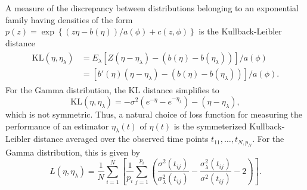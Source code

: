 A measure of the discrepancy between distributions belonging to an exponential family having densities of the form $p\left(z\right) = \exp\left\{\left(z \eta - b\left(\eta\right)\right)/a\left(\phi\right) + c\left(z,\phi\right) \right\}$ is the Kullback-Leibler distance
\begin{align}
\begin{split} \label{eq:kl-distance-definition}
\mbox{KL}\left(\eta, \eta_\lambda\right) &= E_\lambda\left[Z \left(\eta - \eta_\lambda \right) - \left(b\left(\eta\right)- b\left(\eta_\lambda\right) \right)\right]/a\left(\phi\right)\\
&=\left[ b'\left(\eta\right) \left(\eta - \eta_\lambda \right) - \left(b\left(\eta\right)- b\left(\eta_\lambda\right) \right)\right]/a\left(\phi\right).
\end{split}
\end{align}
\noindent
For the Gamma distribution, the KL distance simplifies to
\[
\mbox{KL}\left(\eta, \eta_\lambda\right) = -\sigma^2\left( e^{-\eta} - e^{-{\eta_\lambda}}\right) - \left(\eta-{\eta_\lambda}\right),
\]
\noindent
which is not symmetric. Thus, a natural choice of loss function for measuring the performance of an estimator $\eta_\lambda\left(t\right)$ of $\eta \left(t\right)$ is the symmeterized Kullback-Leibler distance averaged over the observed time points $t_{11}, \dots ,  t_{N,p_N}$. For the Gamma distribution, this is given by 
\begin{equation}\label{eq:gamma-SKL-loss-function}
 L\left( \eta,\eta_\lambda \right) = \frac{1}{N}\sum_{i=1}^N \left[\frac{1}{p_i}\sum_{j=1}^{p_i}  \left( \frac{\sigma^2\left(t_{ij}\right)}{\sigma^2_\lambda\left(t_{ij}\right)} - \frac{\sigma^2_\lambda \left(t_{ij}\right)}{\sigma^2\left(t_{ij}\right)} - 2\right)\right].
\end{equation}
\noindent
